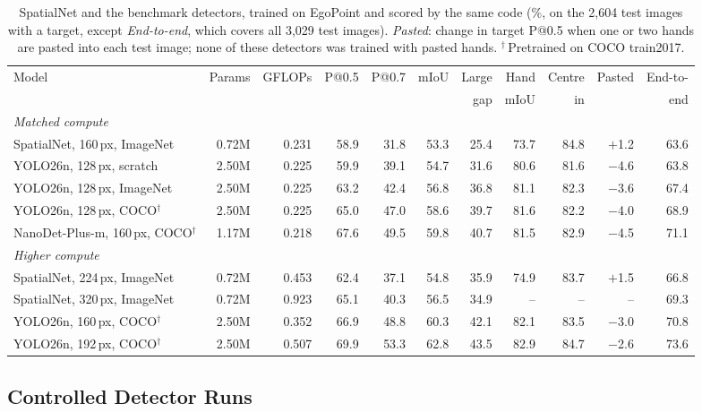 \begin{table}[h]
  \caption{SpatialNet and the benchmark detectors, trained on EgoPoint and scored by the same code (\%, on the 2,604 test images with a target, except \emph{End-to-end}, which covers all 3,029 test images). \emph{Pasted}: change in target P@0.5 when one or two hands are pasted into each test image; none of these detectors was trained with pasted hands. $^\dagger$\,Pretrained on COCO train2017.}
  \label{tab:detectors}
  \footnotesize
  \setlength{\tabcolsep}{3pt}
  \begin{tabular}{lrrrrrrrrrr}
    \toprule
    Model & Params & GFLOPs & P@0.5 & P@0.7 & mIoU & Large & Hand & Centre & Pasted & End-to- \\
    & & & & & & gap & mIoU & in & & end \\
    \midrule
    \multicolumn{11}{l}{\emph{Matched compute}} \\
    SpatialNet, 160\,px, ImageNet & 0.72M & 0.231 & 58.9 & 31.8 & 53.3 & 25.4 & 73.7 & 84.8 & $+$1.2 & 63.6 \\
    YOLO26n, 128\,px, scratch & 2.50M & 0.225 & 59.9 & 39.1 & 54.7 & 31.6 & 80.6 & 81.6 & $-$4.6 & 63.8 \\
    YOLO26n, 128\,px, ImageNet & 2.50M & 0.225 & 63.2 & 42.4 & 56.8 & 36.8 & 81.1 & 82.3 & $-$3.6 & 67.4 \\
    YOLO26n, 128\,px, COCO$^\dagger$ & 2.50M & 0.225 & 65.0 & 47.0 & 58.6 & 39.7 & 81.6 & 82.2 & $-$4.0 & 68.9 \\
    NanoDet-Plus-m, 160\,px, COCO$^\dagger$ & 1.17M & 0.218 & 67.6 & 49.5 & 59.8 & 40.7 & 81.5 & 82.9 & $-$4.5 & 71.1 \\
    \midrule
    \multicolumn{11}{l}{\emph{Higher compute}} \\
    SpatialNet, 224\,px, ImageNet & 0.72M & 0.453 & 62.4 & 37.1 & 54.8 & 35.9 & 74.9 & 83.7 & $+$1.5 & 66.8 \\
    SpatialNet, 320\,px, ImageNet & 0.72M & 0.923 & 65.1 & 40.3 & 56.5 & 34.9 & -- & -- & -- & 69.3 \\
    YOLO26n, 160\,px, COCO$^\dagger$ & 2.50M & 0.352 & 66.9 & 48.8 & 60.3 & 42.1 & 82.1 & 83.5 & $-$3.0 & 70.8 \\
    YOLO26n, 192\,px, COCO$^\dagger$ & 2.50M & 0.507 & 69.9 & 53.3 & 62.8 & 43.5 & 82.9 & 84.7 & $-$2.6 & 73.6 \\
    \bottomrule
  \end{tabular}
\end{table}

\subsection{Controlled Detector Runs}\label{app:controlled}

